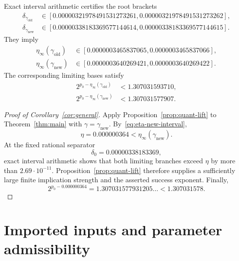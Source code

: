 \documentclass[11pt]{article}
\begin{document}
Exact interval arithmetic certifies the root brackets
\begin{align*}
 \delta_{\gamma_{\mathrm{old}}}
 &\in
 [0.00000321978491531273261,
  0.00000321978491531273262],\\
 \delta_{\gamma_{\mathrm{new}}}
 &\in
 [0.00000338183369577144614,
  0.00000338183369577144615].
\end{align*}
They imply
\begin{align}
 \eta_\infty(\gamma_{\mathrm{old}})
 &\in
 [0.0000003465837065,
  0.0000003465837066],
 \label{eq:eta-old-interval}\\
 \eta_\infty(\gamma_{\mathrm{new}})
 &\in
 [0.0000003640269421,
  0.0000003640269422].
 \label{eq:eta-new-interval}
\end{align}
The corresponding limiting bases satisfy
\begin{align*}
 2^{p_0-\eta_\infty(\gamma_{\mathrm{old}})}
 &<1.307031593710,\\
 2^{p_0-\eta_\infty(\gamma_{\mathrm{new}})}
 &<1.307031577907.
\end{align*}

\begin{proof}[Proof of Corollary~\ref{cor:general}]
Apply Proposition~\ref{prop:quant-lift} to Theorem~\ref{thm:main} with $\gamma=\gamma_{\mathrm{new}}$.  By~\eqref{eq:eta-new-interval},
\[
 \eta=0.000000364
 <\eta_\infty(\gamma_{\mathrm{new}}).
\]
At the fixed rational separator
\[
 \delta_0=0.00000338183369,
\]
exact interval arithmetic shows that both limiting branches exceed $\eta$ by more than $2.69\cdot10^{-11}$.  Proposition~\ref{prop:quant-lift} therefore supplies a sufficiently large finite implication strength and the asserted success exponent.  Finally,
\[
 2^{p_0-0.000000364}
 =1.307031577931205\ldots
 <1.307031578.
\]
\end{proof}

\appendix

\section{Imported inputs and parameter admissibility}\label{app:provenance}
\end{document}

